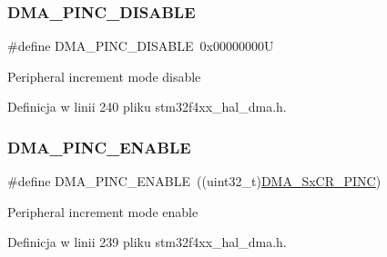 \subsubsection{\texorpdfstring{D\+M\+A\+\_\+\+P\+I\+N\+C\+\_\+\+D\+I\+S\+A\+B\+LE}{DMA\_PINC\_DISABLE}}
{\footnotesize\ttfamily \#define D\+M\+A\+\_\+\+P\+I\+N\+C\+\_\+\+D\+I\+S\+A\+B\+LE~0x00000000U}

Peripheral increment mode disable 

Definicja w linii 240 pliku stm32f4xx\+\_\+hal\+\_\+dma.\+h.

\mbox{\label{group___d_m_a___peripheral__incremented__mode_gab6d84e5805302516d26c06fb4497a346}} 
\subsubsection{\texorpdfstring{D\+M\+A\+\_\+\+P\+I\+N\+C\+\_\+\+E\+N\+A\+B\+LE}{DMA\_PINC\_ENABLE}}
{\footnotesize\ttfamily \#define D\+M\+A\+\_\+\+P\+I\+N\+C\+\_\+\+E\+N\+A\+B\+LE~((uint32\+\_\+t)\hyperlink{group___peripheral___registers___bits___definition_ga29c5d5c559dd14646fdc170e74f1f03b}{D\+M\+A\+\_\+\+Sx\+C\+R\+\_\+\+P\+I\+NC})}

Peripheral increment mode enable 

Definicja w linii 239 pliku stm32f4xx\+\_\+hal\+\_\+dma.\+h.

